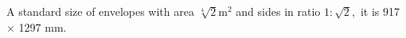 A standard size of envelopes with area $ \sqrt[4]{2} \mathrm{m} ^2 $ and sides in ratio
$ 1 : \sqrt{2} , $ it is 917 \ensuremath{ \times } 1297 mm.